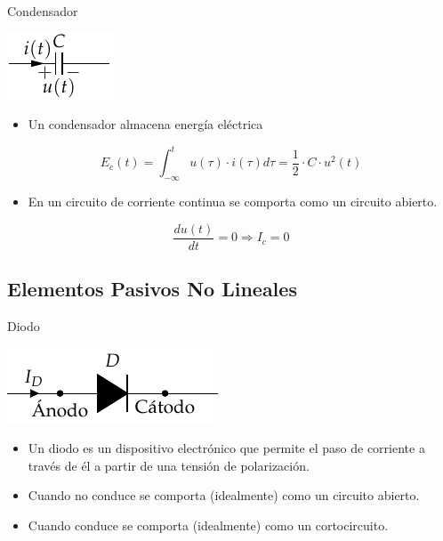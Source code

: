 \documentclass[xcolor={usenames,svgnames,dvipsnames}]{beamer}
\begin{document}
\begin{frame}[label={sec:orgde662c0}]{Condensador}
\begin{center}
\includegraphics[height=0.2\textheight]{figs/Condensador.pdf}
\end{center}

\begin{itemize}
\item Un condensador almacena \alert{energía eléctrica}
\end{itemize}

\[
  E_c(t) = \int_{-\infty}^t u(\tau) \cdot i(\tau) d\tau = \frac{1}{2} \cdot C \cdot u^2(t)
\]

\begin{itemize}
\item En un circuito de corriente continua se comporta como un circuito abierto.
\end{itemize}

\begin{equation*}
  \frac{du(t)}{dt} = 0 \Rightarrow I_c = 0
\end{equation*}
\end{frame}

\subsection{Elementos Pasivos No Lineales}
\label{sec:org3b24854}

\begin{frame}[label={sec:org31c95e6}]{Diodo}
\begin{center}
\includegraphics[height=0.15\textheight]{figs/Diodo.pdf}
\end{center}

\begin{itemize}
\item Un diodo es un dispositivo electrónico que permite el paso de
corriente a través de él a partir de una tensión de polarización.

\item Cuando \alert{no conduce} se comporta (idealmente) como un \alert{circuito abierto}.

\item Cuando \alert{conduce} se comporta (idealmente) como un \alert{cortocircuito}.
\end{itemize}
\end{frame}
\end{document}
